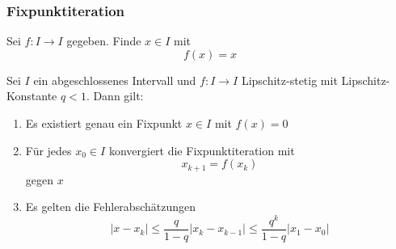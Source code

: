 		\subsubsection{Fixpunktiteration}
			Sei $f:I\to I$ gegeben. Finde $x\in I$ mit
			$$
				f(x)=x
			$$
			\begin{Satz} [ ]
				Sei $I$ ein abgeschlossenes Intervall und $f:I\to I$ Lipschitz-stetig mit Lipschitz-Konstante $q<1$. Dann gilt:
				\begin{enumerate}
					\item Es existiert genau ein Fixpunkt $x\in I$ mit $f(x)=0$
					\item Für jedes $x_0\in I$ konvergiert die Fixpunktiteration mit
						$$
							x_{k+1}=f(x_k)
						$$
						gegen $x$
					\item Es gelten die Fehlerabschätzungen
						$$
							|x-x_k|\leq\frac{q}{1-q}|x_k-x_{k-1}|\leq\frac{q^k}{1-q}|x_1-x_0|
						$$
				\end{enumerate}

			\end{Satz}

		
		
		
		
		
		